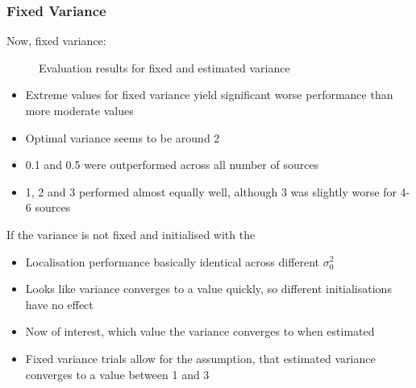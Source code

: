 \subsubsection{Fixed Variance}

Now, fixed variance:

\begin{figure}[H]
	\begin{tikzpicture}
	    
	    
	\end{tikzpicture}
	
	\caption{Evaluation results for fixed and estimated variance}
	\label{fig:boxplotVariance}
\end{figure}

\begin{itemize}
    \item Extreme values for fixed variance yield significant worse performance than more moderate values
    \item Optimal variance seems to be around 2
    \item 0.1 and 0.5 were outperformed across all number of sources
    \item 1, 2 and 3 performed almost equally well, although 3 was slightly worse for 4-6 sources
\end{itemize}

If the variance is not fixed and initialised with the

\begin{itemize}
    \item Localisation performance basically identical across different $\sigma^2_0$
    \item Looks like variance converges to a value quickly, so different initialisations have no effect
    \item Now of interest, which value the variance converges to when estimated
    \item Fixed variance trials allow for the assumption, that estimated variance converges to a value between 1 and 3
\end{itemize}
